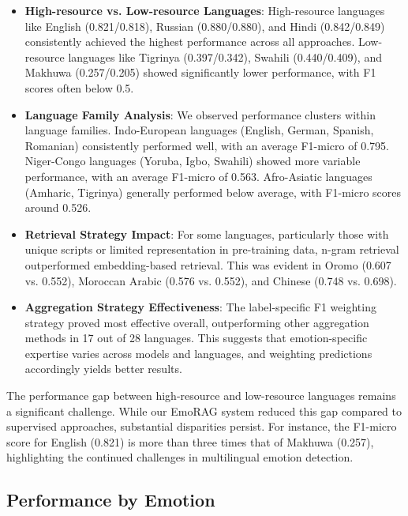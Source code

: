 \documentclass[a4paper,12pt]{extarticle}
\begin{document}
\begin{itemize}
\item \textbf{High-resource vs. Low-resource Languages}: High-resource languages like English (0.821/0.818), Russian (0.880/0.880), and Hindi (0.842/0.849) consistently achieved the highest performance across all approaches. Low-resource languages like Tigrinya (0.397/0.342), Swahili (0.440/0.409), and Makhuwa (0.257/0.205) showed significantly lower performance, with F1 scores often below 0.5.

\item \textbf{Language Family Analysis}: We observed performance clusters within language families. Indo-European languages (English, German, Spanish, Romanian) consistently performed well, with an average F1-micro of 0.795. Niger-Congo languages (Yoruba, Igbo, Swahili) showed more variable performance, with an average F1-micro of 0.563. Afro-Asiatic languages (Amharic, Tigrinya) generally performed below average, with F1-micro scores around 0.526.

\item \textbf{Retrieval Strategy Impact}: For some languages, particularly those with unique scripts or limited representation in pre-training data, n-gram retrieval outperformed embedding-based retrieval. This was evident in Oromo (0.607 vs. 0.552), Moroccan Arabic (0.576 vs. 0.552), and Chinese (0.748 vs. 0.698).

\item \textbf{Aggregation Strategy Effectiveness}: The label-specific F1 weighting strategy proved most effective overall, outperforming other aggregation methods in 17 out of 28 languages. This suggests that emotion-specific expertise varies across models and languages, and weighting predictions accordingly yields better results.
\end{itemize}

The performance gap between high-resource and low-resource languages remains a significant challenge. While our EmoRAG system reduced this gap compared to supervised approaches, substantial disparities persist. For instance, the F1-micro score for English (0.821) is more than three times that of Makhuwa (0.257), highlighting the continued challenges in multilingual emotion detection.

\subsection{Performance by Emotion}
\end{document}
